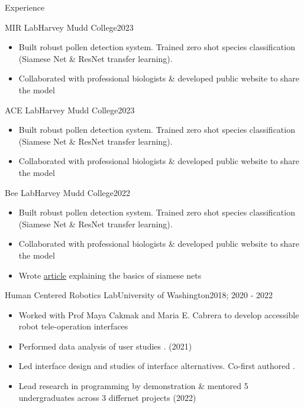 \documentclass[]{mcdowellcv}
\begin{document}
\begin{cvsection}{Experience}
	\begin{cvsubsection}{MIR Lab}{Harvey Mudd College}{2023}
		\begin{itemize}
			\item Built robust pollen detection system. Trained zero shot species classification (Siamese Net \& ResNet transfer learning).
			\item Collaborated with professional biologists \& developed public website to share the model
		\end{itemize}
	\end{cvsubsection}
	\begin{cvsubsection}{ACE Lab}{Harvey Mudd College}{2023}
		\begin{itemize}
			\item Built robust pollen detection system. Trained zero shot species classification (Siamese Net \& ResNet transfer learning).
			\item Collaborated with professional biologists \& developed public website to share the model
		\end{itemize}
	\end{cvsubsection}
	\begin{cvsubsection}{Bee Lab}{Harvey Mudd College}{2022}
		\begin{itemize}
			\item Built robust pollen detection system. Trained zero shot species classification (Siamese Net \& ResNet transfer learning).
			\item Collaborated with professional biologists \& developed public website to share the model
			\item Wrote \href{https://hmcbee.blogspot.com/2022/12/blue-bees-twin-neural-networks-and-more.html}{article} explaining the basics of siamese nets
		\end{itemize}
	\end{cvsubsection}
	\begin{cvsubsection}{Human Centered Robotics Lab}{University of Washington}{2018; 2020 - 2022}
		\begin{itemize}
			\item Worked with Prof Maya Cakmak and Maria E. Cabrera to develop accessible robot tele-operation interfaces
			\item Performed data analysis of user studies \cite{CabreraBDC21}. (2021)
			\item Led interface design and studies of interface alternatives. Co-first authored  \cite{CabreraDKBC21}.
			\item Lead research in programming by demonstration \& mentored 5 undergraduates across 3 differnet projects (2022)
		\end{itemize}
	\end{cvsubsection}


\end{cvsection}
\end{document}
